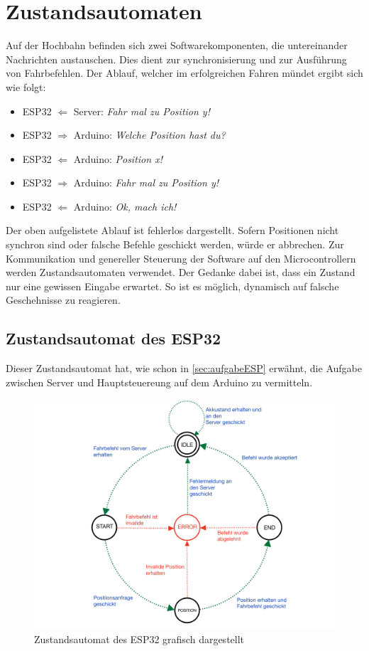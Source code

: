\section{Zustandsautomaten}
Auf der Hochbahn befinden sich zwei Softwarekomponenten, die untereinander Nachrichten austauschen. Dies dient zur synchronisierung und zur Ausführung von Fahrbefehlen. Der Ablauf, welcher im erfolgreichen Fahren mündet ergibt sich wie folgt:
\begin{center}
	\begin{itemize}
		\item ESP32 $\Leftarrow$ Server: \textit{Fahr mal zu Position y!}
		\item ESP32 $\Rightarrow$ Arduino: \textit{Welche Position hast du?}
		\item ESP32 $\Leftarrow$ Arduino: \textit{Position x!}
		\item ESP32 $\Rightarrow$ Arduino: \textit{Fahr mal zu Position y!}
		\item ESP32 $\Leftarrow$ Arduino: \textit{Ok, mach ich!}
	\end{itemize}
\end{center}
Der oben aufgelistete Ablauf ist fehlerlos dargestellt. Sofern Positionen nicht synchron sind oder falsche Befehle geschickt werden, würde er abbrechen. Zur Kommunikation und genereller Steuerung der Software auf den Microcontrollern werden Zustandsautomaten verwendet. Der Gedanke dabei ist, dass ein Zustand nur eine gewissen Eingabe erwartet. So ist es möglich, dynamisch auf falsche Geschehnisse zu reagieren.

\subsection{Zustandsautomat des ESP32}
\label{sec:stateESP}
Dieser Zustandsautomat hat, wie schon in \autoref{sec:aufgabeESP} erwähnt, die Aufgabe zwischen Server und Hauptsteuereung auf dem Arduino zu vermitteln.

\begin{figure}[h]
	\begin{center}
		\includegraphics[width=16cm]{stateMaschineESP.pdf}
		\caption{\label{pic:statemaschineESP}Zustandsautomat des ESP32 grafisch dargestellt}
	\end{center}
\end{figure}

